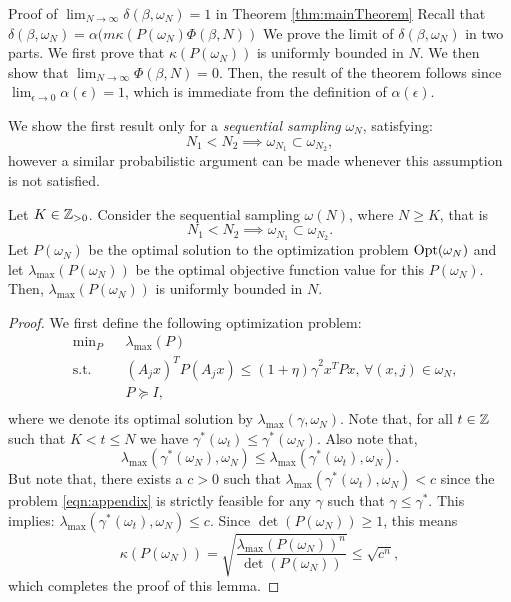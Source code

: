 \begin{subsection}{Proof of  $\lim_{N \to \infty}\delta(\beta, \omega_N) = 1$ in Theorem \ref{thm:mainTheorem}} \label{app:delta}
Recall that $\delta(\beta, \omega_N) = \alpha(m\kappa(P(\omega_N) \Phi(\beta,N))$
We prove the limit of $\delta(\beta, \omega_N)$ in two parts. We first prove that $\kappa(P(\omega_N))$ is uniformly bounded in $N$. We then show that $\lim_{N \to \infty} \Phi(\beta,N) = 0$. Then, the result of the theorem follows since $\lim_{\epsilon \to 0}\alpha(\epsilon) = 1$, which is immediate from the definition of $\alpha(\epsilon)$.

We show the first result only for a \emph{sequential sampling} $\omega_N$, satisfying:
$$N_1  < N_2 \implies \omega_{N_1} \subset \omega_{N_2},$$
however a similar probabilistic argument can be made whenever this assumption is not satisfied.
\begin{lemma}\label{lem:bounded} Let $K \in \mathbb{Z}_{>0}$. Consider the sequential sampling $\omega(N)$, where $N\geq K$, that is $$N_1  < N_2 \implies \omega_{N_1} \subset \omega_{N_2}.$$ Let $P(\omega_N)$ be the optimal solution to the optimization problem $\text{Opt}(\omega_N)$ and let $\lambda_{\max}(P(\omega_N))$ be the optimal objective function value for this $P(\omega_N)$. Then, $\lambda_{\max}(P(\omega_N))$ is uniformly bounded in $N$.
\end{lemma}

\begin{proof}We first define the following optimization problem:
\begin{equation}\label{eqn:appendix}
\begin{aligned}
& \text{min}_{P} & & \lambda_{\max}(P) \\
& \text{s.t.} 
&  & (A_j x)^TP(A_j x) \leq {(1 +\eta)\gamma}^2 x^TPx,\,\forall (x, j) \in \omega_N, \\
& && P \succeq I, \\
\end{aligned}
\end{equation}
where we denote its optimal solution by $\lambda_{\max}(\gamma , \omega_N)$.
Note that, for all $t \in \mathbb{Z}$ such that $K < t \leq N$ we have $\gamma^*(\omega_t) \leq \gamma^*(\omega_N)$. Also note that,
\begin{equation*}\lambda_{\max}(\gamma^*(\omega_N), \omega_N) \leq \lambda_{\max}(\gamma^*(\omega_t), \omega_N).
\end{equation*}
But note that, there exists a $c > 0$ such that $\lambda_{\max}(\gamma^*(\omega_t), \omega_N) <  c$ since the problem \eqref{eqn:appendix} is strictly feasible for any $\gamma$ such that $\gamma \leq \gamma^*$. This implies: $\lambda_{\max}(\gamma^*(\omega_t), \omega_N) \leq c$. Since $\det(P(\omega_N)) \geq 1$, this means $$\kappa(P(\omega_N)) = \sqrt{\frac{\lambda_{\max}(P(\omega_N))^n}{\det(P(\omega_N))}} \leq \sqrt{c^n},$$ which completes the proof of this lemma.
\end{proof}



\end{subsection}
